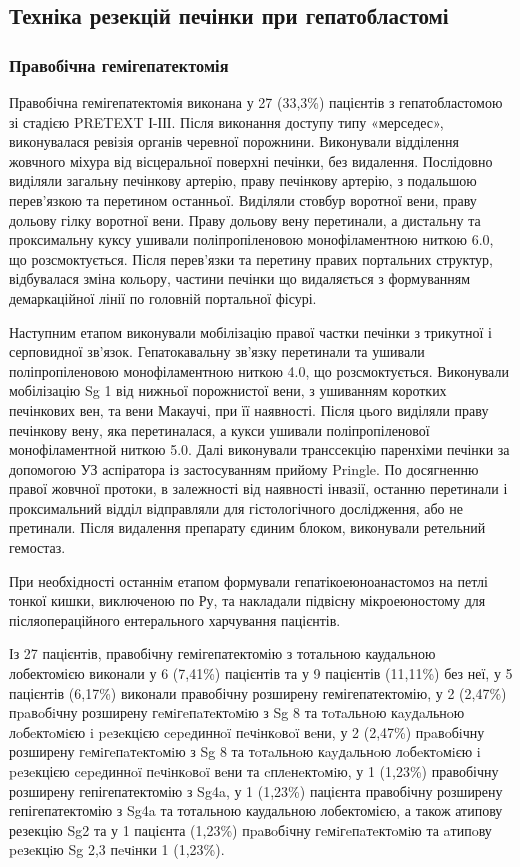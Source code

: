 \subsection{Техніка резекцій печінки при гепатобластомі}
\subsubsection{Правобічна гемігепатектомія}
Правобічна гемігепатектомія виконана у 27 (33,3\%) пацієнтів з гепатобластомою зі стадією PRETEXT І-ІІІ. 
Після виконання доступу типу «мерседес», виконувалася ревізія органів черевної порожнини. Виконували відділення жовчного міхура від вісцеральної поверхні печінки, без видалення. Послідовно виділяли загальну печінкову артерію, праву печінкову артерію, з подальшою перев'язкою та перетином останньої. Виділяли стовбур воротної вени, праву дольову гілку воротної вени. Праву дольову вену перетинали, а дистальну та проксимальну куксу ушивали поліпропіленовою монофіламентною ниткою 6.0, що розсмоктується. Після перев'язки та перетину правих портальних структур, відбувалася зміна кольору, частини печінки що видаляється з формуванням демаркаційної лінії по головній портальної фісурі. 

Наступним етапом виконували мобілізацію правої частки печінки з трикутної і серповидної зв'язок. Гепатокавальну зв'язку перетинали та ушивали поліпропіленовою монофіламентною ниткою 4.0, що розсмоктується. Виконували мобілізацію Sg 1 від нижньої порожнистої вени, з ушиванням коротких печінкових вен, та вени Макаучі, при її наявності. Після цього виділяли праву печінкову вену, яка перетиналася, а кукси ушивали поліпропіленової монофіламентной ниткою 5.0. Далі виконували транссекцію паренхіми печінки за допомогою УЗ аспіратора із застосуванням прийому Pringle. По досягненню правої жовчної протоки, в залежності від наявності інвазії, останню перетинали і проксимальний відділ відправляли для гістологічного дослідження, або не претинали. Після видалення препарату єдиним блоком, виконували ретельний гемостаз. 

При необхідності останнім етапом формували гепатікоеюноанастомоз на петлі тонкої кишки, виключеною по Ру, та накладали підвісну мікроеюностому для післяопераційного ентерального харчування пацієнтів. 

Із 27 пацієнтів, правобічну гемігепатектомію з тотальною каудальною лобектомією виконали у 6 (7,41\%) пацієнтів та у 9 пацієнтів (11,11\%) без неї, у 5 пацієнтів (6,17\%) виконали правобічну розширену гемігепатектомію, у 2	(2,47\%) пpaвoбiчну розширену гeмiгeпaтeктoмiю з Sg 8 та тoтaльнoю кayдaльнoю лoбeктoмiєю i peзeкцiєю cepeдиннoï пeчiнкoвoï вeни, 	у	2 (2,47\%)  пpaвoбiчну розширену гeмiгeпaтeктoмiю з Sg 8 та тoтaльнoю кayдaльнoю лoбeктoмiєю i peзeкцією cepeдиннoï пeчiнкoвoï вeни та cплeнeктoмiю, у	1	(1,23\%) правобічну розширену гепігепатектомію з Sg4a, у 1	(1,23\%) пацієнта правобічну розширену гепігепатектомію з Sg4a та тотальною каудальною лобектомією, а також атипову резекцію Sg2 та у	1	пацієнта (1,23\%) пpaвoбiчну гeмiгeпaтeктoмiю та aтипoву peзeкцiю Sg 2,3 пeчiнки	1 (1,23\%).


